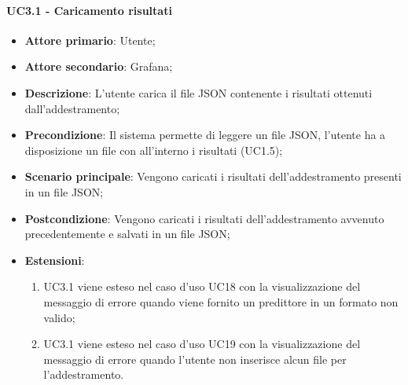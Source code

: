 \paragraph{UC3.1 - Caricamento risultati}
\label{para:uc3.1}
\begin{itemize}
  \item \textbf{Attore primario}: Utente;
  \item \textbf{Attore secondario}: Grafana;
  \item \textbf{Descrizione}: L'utente carica il file JSON contenente i risultati ottenuti dall'addestramento;
  \item \textbf{Precondizione}: Il sistema permette di leggere un file JSON, l'utente ha a disposizione un file con all'interno i risultati (UC1.5);
  \item \textbf{Scenario principale}: Vengono caricati i risultati dell'addestramento presenti in un file JSON;
  \item \textbf{Postcondizione}: Vengono caricati i risultati dell'addestramento avvenuto precedentemente e salvati in un file JSON;
  \item \textbf{Estensioni}:
  \begin{enumerate}
    \item UC3.1 viene esteso nel caso d'uso UC18 con la visualizzazione del messaggio di errore quando viene fornito un predittore in un formato non valido;
    \item UC3.1 viene esteso nel caso d'uso UC19 con la visualizzazione del messaggio di errore quando l'utente non inserisce alcun file per l'addestramento.
    \end{enumerate}
\end{itemize}

